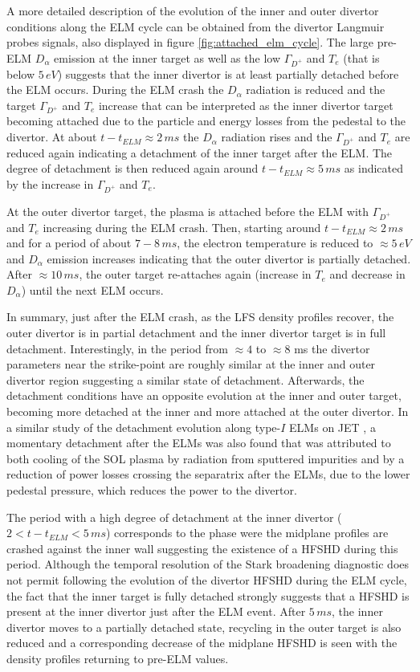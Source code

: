 \documentclass[12pt]{iopart}
\begin{document}
A more detailed description of the evolution of the inner and outer divertor conditions along the ELM cycle can be obtained from the divertor Langmuir probes signals, also displayed in figure \ref{fig:attached_elm_cycle}. The large pre-ELM $D_\alpha$ emission at the inner target as well as the low $\Gamma_{D^{+}}$ and $T_e$ (that is below $5\,eV$) suggests that the inner divertor is at least partially detached before the ELM occurs. During the ELM crash the $D_\alpha$ radiation is reduced and the target $\Gamma_{D^{+}}$ and $T_e$ increase that can be interpreted as the inner divertor target becoming attached due to the particle and energy losses from the pedestal to the divertor. At about $t-t_{ELM} \approx 2\,ms$ the $D_\alpha$ radiation rises and the $\Gamma_{D^{+}}$ and $T_e$ are reduced again indicating a detachment of the inner target after the ELM. The degree of detachment is then reduced again around $t-t_{ELM} \approx 5\,ms$ as indicated by the increase in $\Gamma_{D^{+}}$ and $T_e$.

At the outer divertor target, the plasma is attached before the ELM with $\Gamma_{D^{+}}$ and $T_e$ increasing during the ELM crash. Then, starting around $t-t_{ELM} \approx 2\,ms$ and for a period of about $7-8\,ms$, the electron temperature is reduced to $\approx 5\,eV$ and $D_\alpha$ emission increases indicating that the outer divertor is partially detached.  After $\approx 10\,ms$, the outer target re-attaches again (increase in $T_e$ and decrease in $D_\alpha$) until the next ELM occurs.

In summary, just after the ELM crash, as the LFS density profiles recover, the outer divertor is in partial detachment and the inner divertor target is in full detachment. Interestingly, in the period from $\approx 4$ to $\approx 8$ ms the divertor parameters near the strike-point are roughly similar at the inner and outer divertor region suggesting a similar state of detachment. Afterwards, the detachment conditions have an opposite evolution at the inner and outer target, becoming more detached at the inner and more attached at the outer divertor. In a similar study of the detachment evolution along type-$I$ ELMs on JET \cite{field2017}, a momentary detachment after the ELMs was also found that was attributed to  both cooling of the SOL plasma by radiation from sputtered impurities and by a reduction of power losses crossing the separatrix after the ELMs, due to the lower pedestal pressure, which reduces the power to the divertor.

The period with a high degree of detachment at the inner divertor ($2 < t-t_{ELM} < 5\,ms$) corresponds to the phase were the midplane profiles are crashed against the inner wall suggesting the existence of a HFSHD during this period. Although the temporal resolution of the Stark broadening diagnostic does not permit following the evolution of the divertor HFSHD during the ELM cycle, the fact that the inner target is fully detached strongly suggests that a HFSHD is present at the inner divertor just after the ELM event. After $5\,ms$, the inner divertor moves to a partially detached state, recycling in the outer target is also reduced and a corresponding decrease of the midplane HFSHD is seen with the density profiles returning to pre-ELM values.
\end{document}
